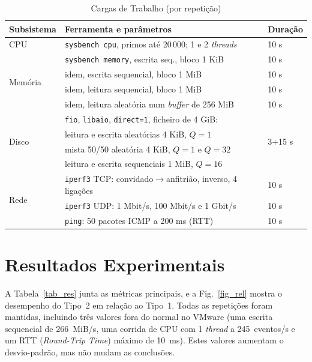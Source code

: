 \documentclass[conference]{IEEEtran}
\begin{document}
\begin{table}[t]
\caption{Cargas de Trabalho (por repetição)}
\label{tab_cargas}
\centering
\scriptsize
\setlength{\tabcolsep}{2.5pt}
\begin{tabular}{@{}lll@{}}
\toprule
\textbf{Subsistema} & \textbf{Ferramenta e parâmetros} & \textbf{Duração} \\
\midrule
CPU & \texttt{sysbench cpu}, primos até 20\,000; 1 e 2 \textit{threads} & 10 s \\
\midrule
\multirow{4}{*}{Memória} & \texttt{sysbench memory}, escrita seq., bloco 1 KiB & 10 s \\
 & idem, escrita sequencial, bloco 1 MiB & 10 s \\
 & idem, leitura sequencial, bloco 1 MiB & 10 s \\
 & idem, leitura aleatória num \textit{buffer} de 256 MiB & 10 s \\
\midrule
\multirow{4}{*}{Disco} & \texttt{fio}, \texttt{libaio}, \texttt{direct=1}, ficheiro de 4 GiB: & \multirow{4}{*}{3+15 s} \\
 & \quad leitura e escrita aleatórias 4 KiB, $Q=1$ & \\
 & \quad mista 50/50 aleatória 4 KiB, $Q=1$ e $Q=32$ & \\
 & \quad leitura e escrita sequenciais 1 MiB, $Q=16$ & \\
\midrule
\multirow{3}{*}{Rede} & \texttt{iperf3} TCP: convidado$\to$anfitrião, inverso, 4 ligações & 10 s \\
 & \texttt{iperf3} UDP: 1 Mbit/s, 100 Mbit/s e 1 Gbit/s & 10 s \\
 & \texttt{ping}: 50 pacotes ICMP a 200 ms (RTT) & 10 s \\
\bottomrule
\end{tabular}
\end{table}

\section{Resultados Experimentais}\label{sec_res}
A Tabela~\ref{tab_res} junta as métricas principais, e a Fig.~\ref{fig_rel} mostra o desempenho do Tipo~2 em relação ao Tipo~1. Todas as repetições foram mantidas, incluindo três valores fora do normal no VMware (uma escrita sequencial de 266~MiB/s, uma corrida de CPU com 1 \textit{thread} a 245~eventos/s e um RTT (\textit{Round-Trip Time}) máximo de 10~ms). Estes valores aumentam o desvio-padrão, mas não mudam as conclusões.
\end{document}
